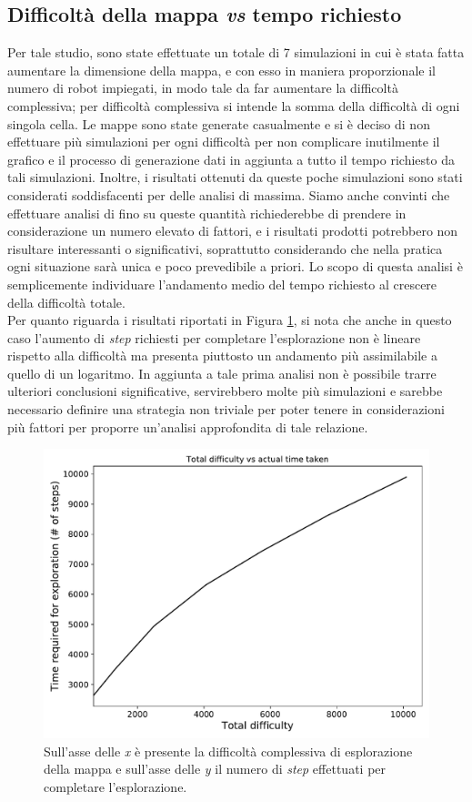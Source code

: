 \subsection{Difficoltà della mappa \textit{vs} tempo richiesto}
Per tale studio, sono state effettuate un totale di 7 simulazioni in cui è stata fatta aumentare la dimensione della mappa, e con esso in maniera proporzionale il numero di robot impiegati, in modo tale da far aumentare la difficoltà complessiva; per difficoltà complessiva si intende la somma della difficoltà di ogni singola cella.
Le mappe sono state generate casualmente e si è deciso di non effettuare più simulazioni per ogni difficoltà per non complicare inutilmente il grafico e il processo di generazione dati in aggiunta a tutto il tempo richiesto da tali simulazioni. Inoltre, i risultati ottenuti da queste poche simulazioni sono stati considerati soddisfacenti per delle analisi di massima.
Siamo anche convinti che effettuare analisi di fino su queste quantità richiederebbe di prendere in considerazione un numero elevato di fattori, e i risultati prodotti potrebbero non risultare interessanti o significativi, soprattutto considerando che nella pratica ogni situazione sarà unica e poco prevedibile a priori. Lo scopo di questa analisi è semplicemente individuare l'andamento medio del tempo richiesto al crescere della difficoltà totale.\\
Per quanto riguarda i risultati riportati in Figura \ref{fig:difficulty}, si nota che anche in questo caso l'aumento di \textit{step} richiesti per completare l'esplorazione non è lineare rispetto alla difficoltà ma presenta piuttosto un andamento più assimilabile a quello di un logaritmo.
In aggiunta a tale prima analisi non è possibile trarre ulteriori conclusioni significative, servirebbero molte più simulazioni e sarebbe necessario definire una strategia non triviale per poter tenere in considerazioni più fattori per proporre un'analisi approfondita di tale relazione.
\begin{figure}
	\centering
	\includegraphics[width=0.9\linewidth]{images/macro_results/difficulty}
	\caption{Sull'asse delle \textit{x} è presente la difficoltà complessiva di esplorazione della mappa e sull'asse delle \textit{y} il numero di \textit{step} effettuati per completare l'esplorazione.}
	\label{fig:difficulty}
\end{figure}
